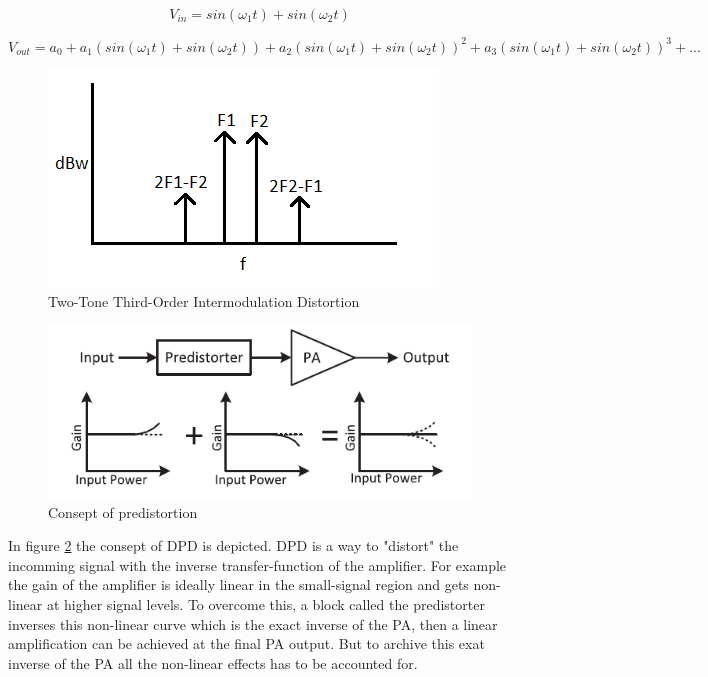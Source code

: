 \begin{equation}\label{eq:dest1}
V_{in} = sin(\omega_1 t) + sin(\omega_2 t)
\end{equation} 

\begin{equation} \label{eq:dest2}
V_{out} = a_0 + a_1 (sin(\omega_1 t) + sin(\omega_2 t)) + a_2 (sin(\omega_1 t) + sin(\omega_2 t))^2 + a_3 (sin(\omega_1 t) + sin(\omega_2 t))^3 + ... 
\end{equation}


\begin{figure}[H]
\centering 
\includegraphics[scale = 0.7]{figures/ch1/amp_psd.png}
\caption{Two-Tone Third-Order Intermodulation Distortion}
\label{fig:amp_psd}
\end{figure}

\begin{figure}[H]
\centering 
\includegraphics[scale = 0.7]{figures/ch1/predistortion_consept.png}
\caption{Consept of predistortion \citep{guo2015}}
\label{fig:pre_cons}
\end{figure}

In figure \ref{fig:pre_cons} the consept of DPD is depicted. DPD is a way to "distort" the incomming signal with the inverse transfer-function of the amplifier. For example the gain of the amplifier is ideally linear in the small-signal region and gets non-linear at higher signal levels. To overcome this, a block called the predistorter inverses this non-linear curve which is the exact inverse of the PA, then a linear amplification can be achieved at the final PA output. But to archive this exat inverse of the PA all the non-linear effects has to be accounted for.   

